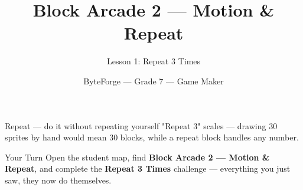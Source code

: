 \documentclass[aspectratio=169]{beamer}
\title{Block Arcade 2 — Motion \& Repeat}
\subtitle{Lesson 1: Repeat 3 Times}
\author{ByteForge --- Grade 7 --- Game Maker}
\date{}
\begin{document}
\begin{frame}
    \titlepage
\end{frame}

\begin{frame}{Repeat — do it without repeating yourself}
    \Large
    "Repeat 3" scales — drawing 30 sprites by hand would mean 30 blocks, while a repeat block handles any number.

    \begin{center}
    \end{center}
\end{frame}

\begin{frame}{Your Turn}
    \Large
    Open the student map, find \textbf{Block Arcade 2 — Motion \& Repeat}, and complete
    the \textbf{Repeat 3 Times} challenge --- everything you just saw, they now do themselves.
\end{frame}
\end{document}
